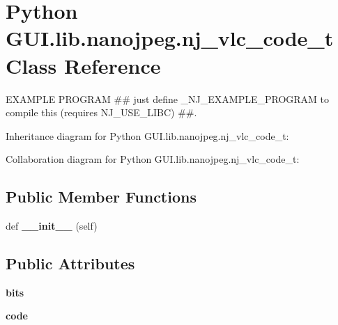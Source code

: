 \hypertarget{class_python_01_g_u_i_1_1lib_1_1nanojpeg_1_1nj__vlc__code__t}{}\section{Python G\+U\+I.\+lib.\+nanojpeg.\+nj\+\_\+vlc\+\_\+code\+\_\+t Class Reference}
\label{class_python_01_g_u_i_1_1lib_1_1nanojpeg_1_1nj__vlc__code__t}


E\+X\+A\+M\+P\+LE P\+R\+O\+G\+R\+AM \#\# just define \+\_\+\+N\+J\+\_\+\+E\+X\+A\+M\+P\+L\+E\+\_\+\+P\+R\+O\+G\+R\+AM to compile this (requires N\+J\+\_\+\+U\+S\+E\+\_\+\+L\+I\+BC) \#\#.  




Inheritance diagram for Python G\+U\+I.\+lib.\+nanojpeg.\+nj\+\_\+vlc\+\_\+code\+\_\+t\+:


Collaboration diagram for Python G\+U\+I.\+lib.\+nanojpeg.\+nj\+\_\+vlc\+\_\+code\+\_\+t\+:
\subsection*{Public Member Functions}
\begin{DoxyCompactItemize}
\item 
\mbox{\label{class_python_01_g_u_i_1_1lib_1_1nanojpeg_1_1nj__vlc__code__t_a4de3713064b6db3b978f6e575da76198}} 
def {\bfseries \+\_\+\+\_\+init\+\_\+\+\_\+} (self)
\end{DoxyCompactItemize}
\subsection*{Public Attributes}
\begin{DoxyCompactItemize}
\item 
\mbox{\label{class_python_01_g_u_i_1_1lib_1_1nanojpeg_1_1nj__vlc__code__t_a160cd61b4f46060c2652c6f5c5fd6a51}} 
{\bfseries bits}
\item 
\mbox{\label{class_python_01_g_u_i_1_1lib_1_1nanojpeg_1_1nj__vlc__code__t_a3add8565dd4daf8c8044b8db04b76429}} 
{\bfseries code}
\end{DoxyCompactItemize}


